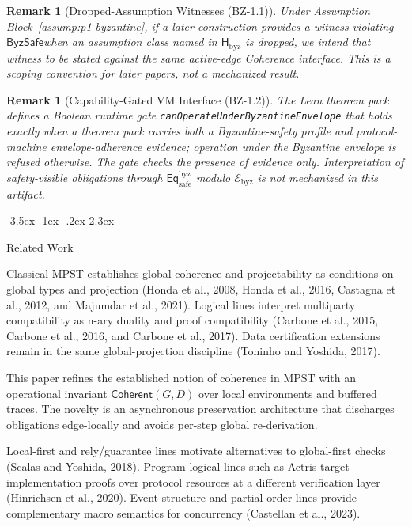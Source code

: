 \documentclass[a4paper,10pt,twocolumn,english]{article}
\makeatletter
\renewcommand{\section}{\@startsection{section}{1}{\z@}%
  {-3.5ex \@plus -1ex \@minus -.2ex}%
  {2.3ex}%
  {\raggedright\normalfont\large\bfseries}}
\numberwithin{equation}{section}
\theoremstyle{paperdef}
\theoremstyle{paperplain}
\theoremstyle{paperdef}
\theoremstyle{paperremark}
\newtheorem{remark}[definition]{Remark}
\newcommand{\Coherent}{\ensuremath{\mathsf{Coherent}}}
\newcommand{\Hbyz}{\ensuremath{\mathsf{H}_{\mathrm{byz}}}}
\newcommand{\Eqsafe}{\ensuremath{\mathsf{Eq}_{\mathrm{safe}}^{\mathrm{byz}}}}
\newcommand{\Ebyz}{\ensuremath{\mathcal{E}_{\mathrm{byz}}}}
\newcommand{\ByzSafe}{\ensuremath{\mathsf{ByzSafe}}}
\makeatother
\begin{document}
\begin{remark}[Dropped-Assumption Witnesses (BZ-1.1)]
	\label{cor:bz1-1}
	Under Assumption Block~\ref{assump:p1-byzantine}, if a later construction provides a witness violating \ByzSafe when an assumption class named in \Hbyz{} is dropped, we intend that witness to be stated against the same active-edge Coherence interface. This is a scoping convention for later papers, not a mechanized result.
\end{remark}

\begin{remark}[Capability-Gated VM Interface (BZ-1.2)]
	\label{prop:bz1-2}
	The Lean theorem pack defines a Boolean runtime gate \texttt{canOperateUnderByzantineEnvelope} that holds exactly when a theorem pack carries both a Byzantine-safety profile and protocol-machine envelope-adherence evidence; operation under the Byzantine envelope is refused otherwise. The gate checks the presence of evidence only. Interpretation of safety-visible obligations through \Eqsafe{} modulo \Ebyz{} is not mechanized in this artifact.
\end{remark}

\section{Related Work}
\label{sec:related}

Classical MPST establishes global coherence and projectability as conditions on global types and projection (Honda et al., 2008, Honda et al., 2016, Castagna et al., 2012, and Majumdar et al., 2021). Logical lines interpret multiparty compatibility as n-ary duality and proof compatibility (Carbone et al., 2015, Carbone et al., 2016, and Carbone et al., 2017). Data certification extensions remain in the same global-projection discipline (Toninho and Yoshida, 2017).

This paper refines the established notion of coherence in MPST with an operational invariant $\Coherent(G,D)$ over local environments and buffered traces. The novelty is an asynchronous preservation architecture that discharges obligations edge-locally and avoids per-step global re-derivation.

Local-first and rely/guarantee lines motivate alternatives to global-first checks (Scalas and Yoshida, 2018). Program-logical lines such as Actris target implementation proofs over protocol resources at a different verification layer (Hinrichsen et al., 2020). Event-structure and partial-order lines provide complementary macro semantics for concurrency (Castellan et al., 2023).
\end{document}
